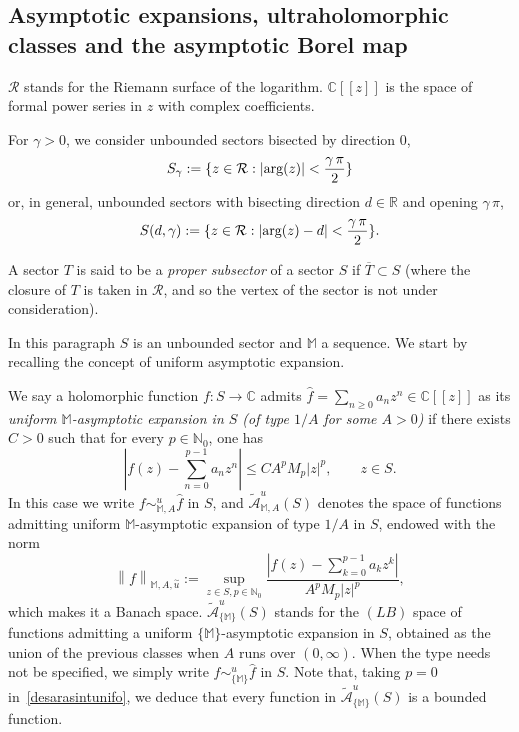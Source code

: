 \documentclass[11pt,a4paper]{article}
\theoremstyle{plain}
\theoremstyle{definition}
\newcommand{\N}{\mathbb{N}}
\newcommand{\R}{\mathbb{R}}
\newcommand{\C}{\mathbb{C}}
\newcommand{\M}{\mathbb{M}}
\def\ga{\gamma}
\begin{document}
\subsection{Asymptotic expansions, ultraholomorphic classes and the asymptotic Borel map}\label{subsectCarlemanclasses}

$\mathcal{R}$ stands for the Riemann surface of the logarithm.
$\C[[z]]$ is the space of formal power series in $z$ with complex coefficients.

For $\gamma>0$, we consider unbounded sectors bisected by direction 0,
$$S_{\gamma}:=\{z\in\mathcal{R}:|\hbox{arg}(z)|<\frac{\gamma\,\pi}{2}\}$$
or, in general, unbounded sectors with bisecting direction $d\in\R$ and opening $\ga\,\pi$,
$$S(d,\ga):=\{z\in\mathcal{R}:|\hbox{arg}(z)-d|<\frac{\ga\,\pi}{2}\}.$$

A sector $T$ is said to be a \emph{proper subsector} of a sector $S$ if $\overline{T}\subset S$ (where the closure of $T$ is taken in $\mathcal{R}$, and so the vertex of the sector is not under consideration).

In this paragraph $S$ is an unbounded sector and $\M$ a sequence. We start by recalling the concept of uniform asymptotic expansion.

We say a holomorphic function $f\colon S\to\C$ admits $\widehat{f}=\sum_{n\ge 0}a_nz^n\in\C[[z]]$ as its \emph{uniform $\M$-asymptotic expansion in $S$ (of type $1/A$ for some $A>0$)} if there exists $C>0$ such that for every $p\in\N_0$, one has
\begin{equation}\left|f(z)-\sum_{n=0}^{p-1}a_nz^n \right|\le CA^pM_{p}|z|^p,\qquad z\in S.\label{desarasintunifo}
\end{equation}
In this case we write $f\sim_{\M,A}^u\widehat{f}$ in $S$, and $\widetilde{\mathcal{A}}^u_{\M,A}(S)$ denotes the space of functions admitting uniform $\M$-asymptotic expansion of type $1/A$ in $S$, endowed with the norm
\begin{equation}\label{eq.NormUniformAsymptFixedType}
\left\|f\right\|_{\M,A,\overset{\sim}{u}}:=\sup_{z\in S,p\in\N_{0}}\frac{|f(z)-\sum_{k=0}^{p-1}a_kz^k|}{A^{p}M_{p}|z|^p},
\end{equation}
which makes it a Banach space. $\widetilde{\mathcal{A}}^u_{\{\M\}}(S)$ stands for the $(LB)$ space of functions admitting a uniform $\{\M\}$-asymptotic expansion in $S$, obtained as the union of the previous classes when $A$ runs over $(0,\infty)$.
When the type needs not be specified, we simply write $f\sim_{\{\M\}}^u\widehat{f}$ in $S$.
Note that, taking $p=0$ in~\eqref{desarasintunifo}, we deduce that every function in $\widetilde{\mathcal{A}}^u_{\{\M\}}(S)$ is a bounded function.
\end{document}
